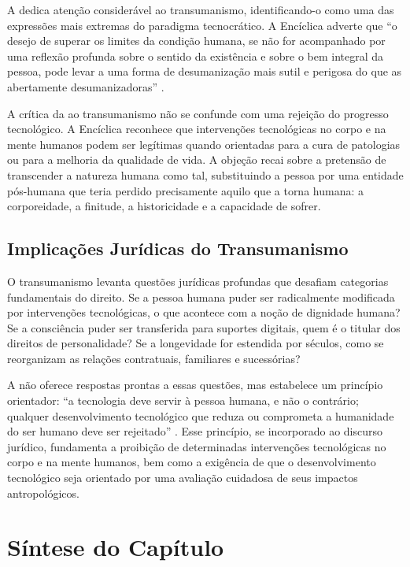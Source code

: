 A \MH{} dedica atenção considerável ao transumanismo, identificando-o como uma das expressões mais extremas do paradigma tecnocrático. A Encíclica adverte que ``o desejo de superar os limites da condição humana, se não for acompanhado por uma reflexão profunda sobre o sentido da existência e sobre o bem integral da pessoa, pode levar a uma forma de desumanização mais sutil e perigosa do que as abertamente desumanizadoras'' \cite{LeaoXIV2026MH}.

A crítica da \MH{} ao transumanismo não se confunde com uma rejeição do progresso tecnológico. A Encíclica reconhece que intervenções tecnológicas no corpo e na mente humanos podem ser legítimas quando orientadas para a cura de patologias ou para a melhoria da qualidade de vida. A objeção recai sobre a pretensão de transcender a natureza humana como tal, substituindo a pessoa por uma entidade pós-humana que teria perdido precisamente aquilo que a torna humana: a corporeidade, a finitude, a historicidade e a capacidade de sofrer.

\subsection{Implicações Jurídicas do Transumanismo}
\label{subsec:implicacoes-juridicas}

O transumanismo levanta questões jurídicas profundas que desafiam categorias fundamentais do direito. Se a pessoa humana puder ser radicalmente modificada por intervenções tecnológicas, o que acontece com a noção de dignidade humana? Se a consciência puder ser transferida para suportes digitais, quem é o titular dos direitos de personalidade? Se a longevidade for estendida por séculos, como se reorganizam as relações contratuais, familiares e sucessórias?

A \MH{} não oferece respostas prontas a essas questões, mas estabelece um princípio orientador: ``a tecnologia deve servir à pessoa humana, e não o contrário; qualquer desenvolvimento tecnológico que reduza ou comprometa a humanidade do ser humano deve ser rejeitado'' \cite{LeaoXIV2026MH}. Esse princípio, se incorporado ao discurso jurídico, fundamenta a proibição de determinadas intervenções tecnológicas no corpo e na mente humanos, bem como a exigência de que o desenvolvimento tecnológico seja orientado por uma avaliação cuidadosa de seus impactos antropológicos.

\section{Síntese do Capítulo}
\label{sec:sumario-cap3}

